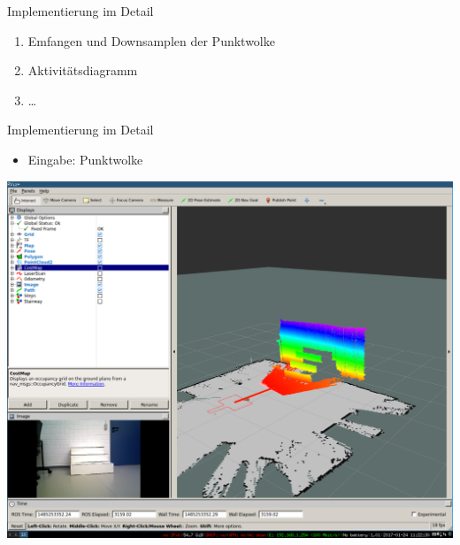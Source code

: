 \documentclass[18pt]{beamer}
\begin{document}
\begin{frame}{Implementierung im Detail}
	\begin{enumerate}
		\item Emfangen und Downsamplen der Punktwolke
		\item Aktivitätsdiagramm
		\item \dots
	\end{enumerate}
\end{frame}

\begin{frame}{Implementierung im Detail}
	\begin{itemize}
		\item Eingabe: Punktwolke
	\end{itemize}
	\begin{center}
		\includegraphics[scale=0.16]{images/ransac00.pdf}
	\end{center}
\end{frame}
\end{document}
